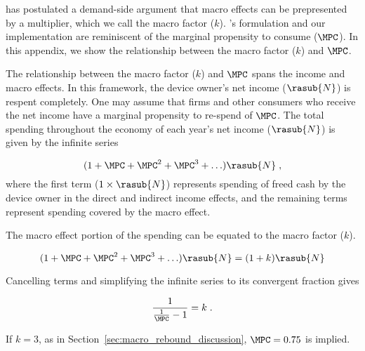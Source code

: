 
\citet{Borenstein:2015aa} has postulated a demand-side argument that macro effects 
can be prepresented by a multiplier, which we call the macro factor ($k$).
\citeauthor{Borenstein:2015aa}'s formulation and our implementation 
are reminiscent of the marginal propensity to consume ($\MPC$).
In this appendix, we show the relationship between the macro factor ($k$) and $\MPC$.

The relationship between the macro factor ($k$) and $\MPC$ spans
the income and macro effects.
In this framework, the device owner's net income ($\rasub{N}$) is respent completely.
One may assume that firms and other consumers who receive the net income have a 
marginal propensity to re-spend of $\MPC$.
The total spending throughout the economy of each year's net income ($\rasub{N}$)
is given by the infinite series

\begin{equation} \label{eq:infinite_series_spending}
  (1 + \MPC + \MPC^2 + \MPC^3 + \ldots) \rasub{N} \; ,
\end{equation}
%
where the first term ($1 \times \rasub{N}$) represents spending of freed cash by the device owner
in the direct and indirect income effects, and
the remaining terms represent spending covered by the macro effect.

The macro effect portion of the spending can be equated to the macro factor ($k$).

\begin{equation} \label{eq:mpc_and_k}
  (1 + \MPC + \MPC^2 + \MPC^3 + \ldots) \rasub{N} = (1 + k) \rasub{N}
\end{equation}

Cancelling terms and simplifying the infinite series to its convergent fraction gives

\begin{equation} \label{eq:mpc_and_k_converged}
  \frac{1}{\frac{1}{\MPC} - 1} = k \; .
\end{equation}

If $k = 3$, as in Section~\ref{sec:macro_rebound_discussion}, 
$\MPC = 0.75$ is implied.
